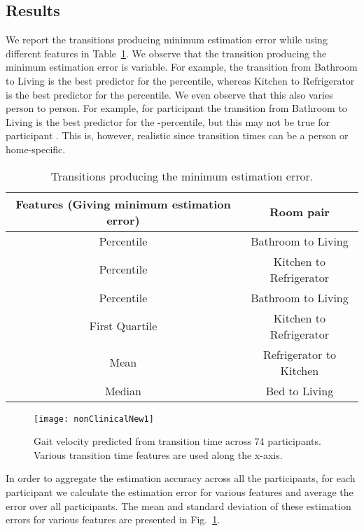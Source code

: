 \documentclass[journal]{IEEEtran}
\begin{document}
\subsection{Results}
We report the transitions producing minimum estimation error while using different features in Table~\ref{tab:filter_coeff_2}. 
We observe that the transition producing the minimum estimation error is variable. For example, the transition from Bathroom to Living is the best predictor for the  percentile, whereas Kitchen to Refrigerator is the best predictor for the  percentile. We even observe that this also varies person to person. For example, for participant  the transition from Bathroom to Living is the best predictor for the -percentile, but this may not be true for participant .  This is, however, realistic since transition times can be a person or home-specific.
\begin{table}[t]
\small
\centering
\caption{Transitions producing the minimum estimation error.}
\setlength{\tabcolsep}{1pt}
\resizebox{6cm}{!} {
\begin{tabular}{|c|c|} \hline
\parbox{3.5cm}{\bf  Features (Giving minimum estimation error)}&{\bf Room pair}\\ \hline
 Percentile&Bathroom to Living  \\ \hline
 Percentile & Kitchen to Refrigerator \\ \hline
 Percentile &Bathroom to Living  \\ \hline
First Quartile&Kitchen to Refrigerator\\ \hline
Mean&Refrigerator to Kitchen\\ \hline
Median&Bed to Living\\ \hline
\end{tabular}
}
\label{tab:filter_coeff_2}
\end{table}

\begin{figure}
\centering
\texttt{[image: nonClinicalNew1]}
\caption{Gait velocity predicted from transition time across 74 participants. Various transition time features are used along the x-axis. }
\label{fig:WalkSpeedVersusTransitionTime}
\end{figure}

In order to aggregate the estimation accuracy across all the participants, for each participant we calculate the estimation error for various features and average the error over all participants. The mean and standard deviation of these estimation errors for various features are presented in Fig.~\ref{fig:WalkSpeedVersusTransitionTime}. 
\end{document}
